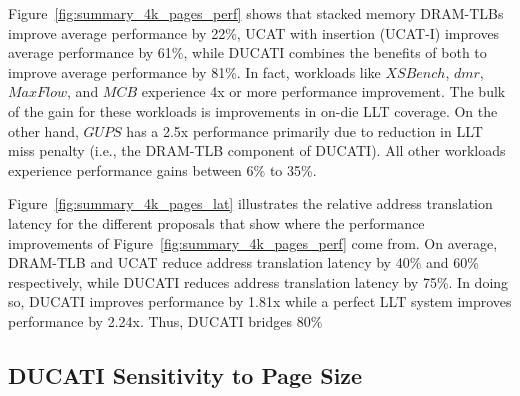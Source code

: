 Figure~\ref{fig:summary_4k_pages_perf} shows that stacked memory DRAM-TLBs
improve average performance by 22\%,
UCAT with insertion (UCAT-I) improves average performance by 61\%,
while DUCATI combines the benefits of both to improve average
performance by 81\%. In fact, workloads like $XSBench$, $dmr$,
$MaxFlow$, and $MCB$ experience 4x or more performance improvement.
The bulk of the gain for these workloads is improvements in on-die LLT
coverage. On the other hand, $GUPS$ has a 2.5x performance primarily
due to reduction in LLT miss penalty (i.e., the DRAM-TLB component of
DUCATI). All other workloads experience performance gains between 6\%
to 35\%.

Figure~\ref{fig:summary_4k_pages_lat} illustrates the relative address
translation latency for the different proposals that show where the performance improvements of Figure~\ref{fig:summary_4k_pages_perf} come from. On average, DRAM-TLB
and UCAT reduce address translation latency by 40\% and 60\%
respectively, while DUCATI reduces address translation latency by
75\%. In doing so, DUCATI improves performance by 1.81x while a
perfect LLT system improves performance by 2.24x. Thus, DUCATI bridges
80\%




\subsection{DUCATI Sensitivity to Page Size}

